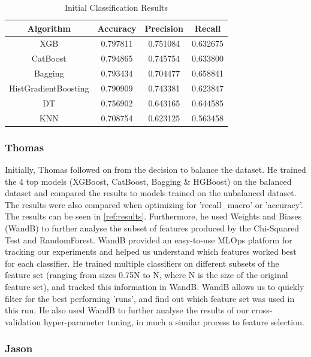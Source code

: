 \documentclass[conference]{IEEEtran}
\begin{document}
\begin{table}[h]
  \centering
  \caption{Initial Classification Results}
  \label{tab:initial-clf-results}
  \begin{tabular}{|c|c|c|c|}
    \hline
    \textbf{Algorithm} & \textbf{Accuracy} & \textbf{Precision} & \textbf{Recall} \\ \hline
    XGB	& 0.797811 & 0.751084 & 0.632675 \\
    \hline
    CatBoost & 0.794865 & 0.745754 & 0.633800 \\
    \hline
    Bagging & 0.793434 & 0.704477 & 0.658841 \\
    \hline
    HistGradientBoosting & 0.790909 & 0.743381 & 0.623847 \\
    \hline
    DT & 0.756902 & 0.643165 & 0.644585 \\
    \hline
    KNN & 0.708754 & 0.623125 & 0.563458 \\
    \hline
  \end{tabular}
\end{table}


\subsubsection{Thomas}

Initially, Thomas followed on from the decision to balance the dataset. He trained the 4 top models (XGBoost, CatBoost, Bagging \& HGBoost) on the balanced dataset and compared the results to models trained on the unbalanced dataset. The results were also compared when optimizing for 'recall\_macro' or 'accuracy'. The results can be seen in \ref{ref:results}. Furthermore, he used Weights and Biases (WandB) \cite{wandb} to further analyse the subset of features produced by the Chi-Squared Test and RandomForest.  WandB provided an easy-to-use MLOps platform for tracking our experiments and helped us understand which features worked best for each classifier. He trained multiple classifiers on different subsets of the feature set (ranging from sizes 0.75N to N, where N is the size of the original feature set), and tracked this information in WandB. WandB allows us to quickly filter for the best performing 'runs', and find out which feature set was used in this run. He also used WandB to further analyse the results of our cross-validation hyper-parameter tuning, in much a similar process to feature selection.

\subsubsection{Jason}
\end{document}
